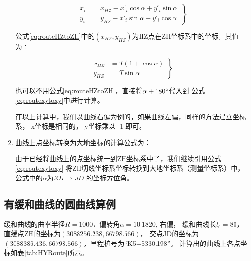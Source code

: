 \begin{enumerate}
\begin{equation}
\left . \begin{aligned}
x_i &= x_{HZ} - x'_i  \cos \alpha + y'_i \sin \alpha \\
y_i &= y_{HZ}  -  x'_i \sin \alpha -  y'_i \cos \alpha
\end{aligned} \right \}
\label{eq:routeHZtoZH}
\end{equation}

公式\ref{eq:routeHZtoZH}中的$(x_{HZ}, y_{HZ})$为HZ点在ZH坐标系中的坐标，其值为：

\begin{equation}
\left .
\begin{aligned}
x_{HZ} &= T (1 +  \cos \alpha) \\
y_{HZ} &=  T \sin \alpha
\end{aligned}
\right \}
\label{eq:routeHZXY}
\end{equation}

也可以不用公式\ref{eq:routeHZtoZH}，直接将$\alpha+180^\circ$代入到
公式\ref{eq:routexytoxy}中进行计算。

在以上计算中，我们以曲线右偏为例的，如果曲线左偏，同样的方法建立坐标系，
x坐标是相同的， y坐标乘以 -1 即可。

\item 曲线上点坐标转换为大地坐标的计算公式为：

由于已经将曲线上的点坐标统一到ZH坐标系中了，我们继续引用公式\ref{eq:routexytoxy}
将ZH切线坐标系坐标转换到大地坐标系（测量坐标系）中，公式中的$\alpha$为$ZH \rightarrow JD$
的坐标方位角。

\end{enumerate}


\subsection{有缓和曲线的圆曲线算例}

缓和曲线的曲率半径$R=1000$，偏转角$\alpha =10.1820$, 右偏，
缓和曲线长$l_0=80$，直缓点ZH的坐标为$(3088256.238, 66798.566)$，
交点JD的坐标为$(3088386.436, 66798.566)$，里程桩号为``K5+5330.198''。
计算出的曲线上各点坐标如表\ref{tab:HYRoute}所示。

